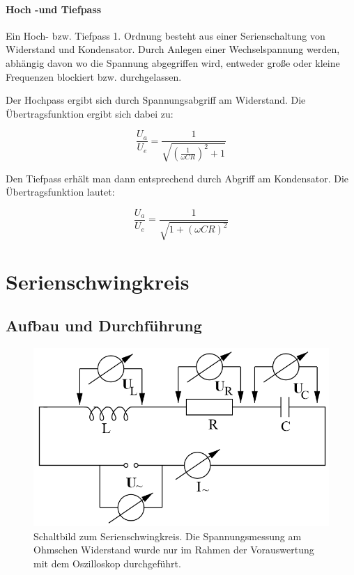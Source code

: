 \documentclass[12pt,a4paper]{article}
\begin{document}
\paragraph{Hoch -und Tiefpass}
Ein Hoch- bzw. Tiefpass 1. Ordnung besteht aus einer Serienschaltung von Widerstand und Kondensator. Durch Anlegen einer Wechselspannung werden, abhängig davon wo die Spannung abgegriffen wird, entweder große oder kleine Frequenzen blockiert bzw. durchgelassen.

Der Hochpass ergibt sich durch Spannungsabgriff am Widerstand. Die Übertragsfunktion ergibt sich dabei zu:

\begin{equation}
\frac{U_a}{U_e} = \frac{1}{\sqrt{(\frac{1}{\omega C R})^2+1}}
\end{equation}

Den Tiefpass erhält man dann entsprechend durch Abgriff am Kondensator. Die Übertragsfunktion lautet:

\begin{equation}
\frac{U_a}{U_e} = \frac{1}{\sqrt{1+(\omega C R)^2}}
\end{equation}

\section{Serienschwingkreis}

\subsection{Aufbau und Durchführung}

\begin{figure}
\centering
\includegraphics[scale=0.8]{Bilder/AufbauSerie.png}
\caption{Schaltbild zum Serienschwingkreis. Die Spannungsmessung am Ohmschen Widerstand wurde nur im Rahmen der Vorauswertung mit dem Oszilloskop durchgeführt.}
\label{fig:AufbauSerie}
\end{figure}
\end{document}
